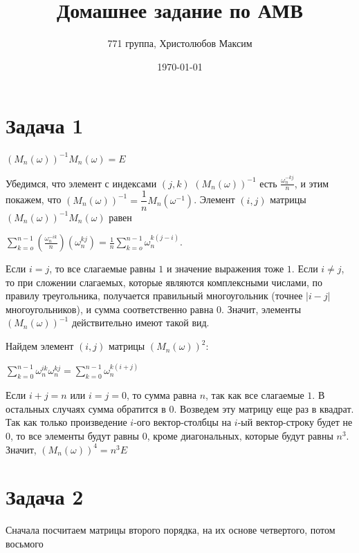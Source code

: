 \documentclass[a4paper,12pt]{article} %
\author{771 группа, Христолюбов Максим}
\title{Домашнее задание по АМВ}
\date{\today}
\begin{document}
	
	\maketitle
	

\section{Задача 1}
\hspace{5mm}

$(M_n(\omega))^{-1}M_n(\omega)=E$

Убедимся, что элемент с индексами $(j,k)$ $(M_n(\omega))^{-1}$ есть $\frac{\omega_n^{-kj}}{n}$, и этим покажем, что $(M_n(\omega))^{-1} = \dfrac{1}{n}M_n(\omega^{-1})$. Элемент $(i,j)$ матрицы $(M_n(\omega))^{-1}M_n(\omega)$ равен

$\sum\limits_{k=o}^{n-1}(\frac{\omega_n^{-ik}}{n})(\omega_n^{kj})=\frac{1}{n}\sum\limits_{k=o}^{n-1}\omega_n^{k(j-i)}$.

Если $i=j$, то все слагаемые равны $1$ и значение выражения тоже $1$. Если $i\neq j$, то при сложении слагаемых, которые являются комплексными числами, по правилу треугольника, получается правильный многоугольник (точнее $|i-j|$ многоугольников), и сумма соответственно равна $0$. Значит, элементы $(M_n(\omega))^{-1}$ действительно имеют такой вид.

Найдем элемент $(i,j)$ матрицы $(M_n(\omega))^{2}$:

$\sum\limits_{k=0}^{n-1}\omega_n^{ik}\omega_n^{kj}=\sum\limits_{k=0}^{n-1}\omega_n^{k(i+j)}$

Если $i+j=n$ или $i=j=0$, то сумма равна $n$, так как все слагаемые $1$. В остальных случаях сумма обратится в $0$. Возведем эту матрицу еще раз в квадрат. Так как только произведение $i$-ого вектор-столбцы на $i$-ый вектор-строку будет не $0$, то все элементы будут равны $0$, кроме диагональных, которые будут равны $n^3$. Значит, $(M_n(\omega))^{4}=n^3E$


\section{Задача 2}
\hspace{5mm}
Сначала посчитаем матрицы второго порядка, на их основе четвертого, потом восьмого
\end{document}
